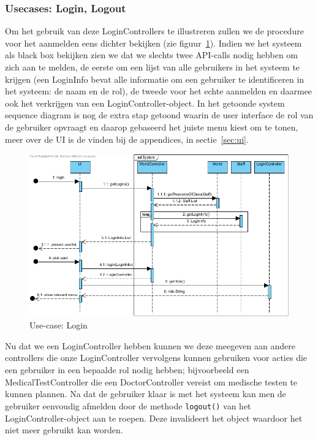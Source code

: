 \documentclass[a4paper]{article}
\begin{document}
\subsubsection{Usecases: Login, Logout}
Om het gebruik van deze LoginControllers te illustreren zullen we de procedure voor het aanmelden eens dichter bekijken (zie figuur~\ref{fig:login}).
Indien we het systeem als black box bekijken zien we dat we slechts twee API-calls nodig hebben om zich aan te melden, de eerste om een lijst van alle gebruikers in het systeem te krijgen (een LoginInfo bevat alle informatie om een gebruiker te identificeren in het systeem: de naam en de rol), de tweede voor het echte aanmelden en daarmee ook het verkrijgen van een LoginController-object. In het getoonde system sequence diagram is nog de extra stap getoond waarin de user interface de rol van de gebruiker opvraagt en daarop gebaseerd het juiste menu kiest om te tonen, meer over de UI is de vinden bij de appendices, in sectie~\ref{sec:ui}.
\begin{figure}[h]
\centering
\includegraphics[width=\textwidth]{Pictures/Login}
\caption{Use-case: Login}
\label{fig:login}
\end{figure}

Nu dat we een LoginController hebben kunnen we deze meegeven aan andere controllers die onze LoginController vervolgens kunnen gebruiken voor acties die een gebruiker in een bepaalde rol nodig hebben; bijvoorbeeld een MedicalTestController die een DoctorController vereist om medische testen te kunnen plannen.
Na dat de gebruiker klaar is met het systeem kan men de gebruiker eenvoudig afmelden door de methode \texttt{logout()} van het LoginController-object aan te roepen. Deze invalideert het object waardoor het niet meer gebruikt kan worden.
\end{document}
